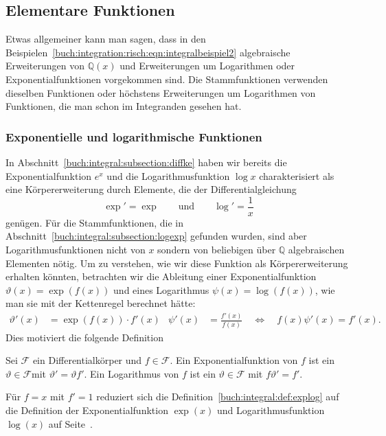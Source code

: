 %
%
%
\subsection{Elementare Funktionen
\label{buch:integral:subsection:elementar}}
Etwas allgemeiner kann man sagen, dass in den
Beispielen~\eqref{buch:integration:risch:eqn:integralbeispiel2}
algebraische Erweiterungen von $\mathbb{Q}(x)$ und Erweiterungen
um Logarithmen oder Exponentialfunktionen vorgekommen sind.
Die Stammfunktionen verwenden dieselben Funktionen oder höchstens
Erweiterungen um Logarithmen von Funktionen, die man schon im
Integranden gesehen hat.

%
%
\subsubsection{Exponentielle und logarithmische Funktionen}
In Abschnitt~\ref{buch:integral:subsection:diffke} haben wir
bereits die Exponentialfunktion $e^x$ und die Logarithmusfunktion 
$\log x$ charakterisiert als eine Körpererweiterung durch 
Elemente, die der Differentialgleichung
\[
\exp' = \exp
\qquad\text{und}\qquad
\log' = \frac{1}{x}
\]
genügen.
Für die Stammfunktionen, die in 
Abschnitt~\ref{buch:integral:subsection:logexp}
gefunden wurden, sind aber Logarithmusfunktionen nicht von
$x$ sondern von beliebigen über $\mathbb{Q}$ algebraischen Elementen
nötig.
Um zu verstehen, wie wir diese Funktion als Körpererweiterung erhalten
könnten, betrachten wir die Ableitung einer Exponentialfunktion
$\vartheta(x) = \exp(f(x))$ und eines
Logarithmus 
$\psi(x) = \log(f(x))$, wie man sie mit der Kettenregel
berechnet hätte:
\begin{align*}
\vartheta'(x)
&=\exp(f(x)) \cdot f'(x)
&
\psi'(x)
&=
\frac{f'(x)}{f(x)}
\quad\Leftrightarrow\quad
f(x)\psi'(x)
=
f'(x).
\end{align*}
Dies motiviert die folgende Definition

\begin{definition}
\label{buch:integral:def:explog}
Sei $\mathscr{F}$ ein Differentialkörper und $f\in\mathscr{F}$.
Ein Exponentialfunktion von $f$ ist ein $\vartheta\in \mathscr{F}$mit
$\vartheta' = \vartheta f'$.
Ein Logarithmus von $f$ ist ein $\vartheta\in\mathscr{F}$ mit
$f\vartheta'=f'$.
\end{definition}

Für $f=x$ mit $f'=1$ reduziert sich die 
Definition~\ref{buch:integral:def:explog}
auf die Definition der Exponentialfunktion $\exp(x)$ und
Logarithmusfunktion $\log(x)$ auf Seite~\pageref{buch:integral:expundlog}.



